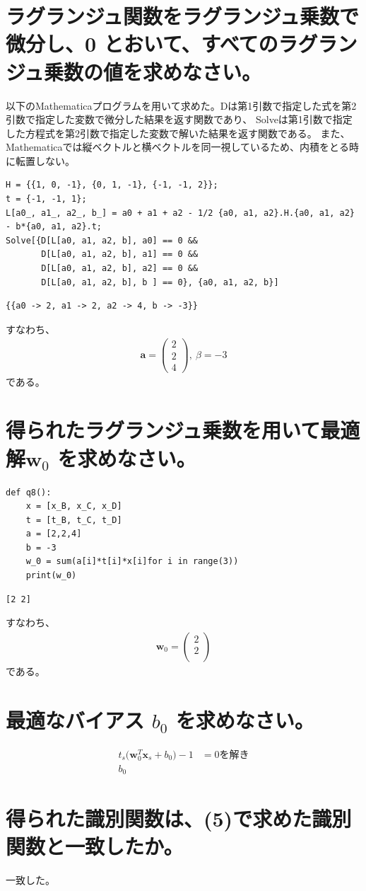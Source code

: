 \documentclass{ltjsarticle}
\begin{document}
\section{ラグランジュ関数をラグランジュ乗数で微分し、0 とおいて、すべてのラグランジュ乗数の値を求めなさい。}
以下のMathematicaプログラムを用いて求めた。Dは第1引数で指定した式を第2引数で指定した変数で微分した結果を返す関数であり、
Solveは第1引数で指定した方程式を第2引数で指定した変数で解いた結果を返す関数である。
また、Mathematicaでは縦ベクトルと横ベクトルを同一視しているため、内積をとる時に転置しない。
\begin{lstlisting}[caption=input]
H = {{1, 0, -1}, {0, 1, -1}, {-1, -1, 2}};
t = {-1, -1, 1};
L[a0_, a1_, a2_, b_] = a0 + a1 + a2 - 1/2 {a0, a1, a2}.H.{a0, a1, a2} - b*{a0, a1, a2}.t;
Solve[{D[L[a0, a1, a2, b], a0] == 0 &&
       D[L[a0, a1, a2, b], a1] == 0 &&
       D[L[a0, a1, a2, b], a2] == 0 &&
       D[L[a0, a1, a2, b], b ] == 0}, {a0, a1, a2, b}]
\end{lstlisting}
\begin{lstlisting}[caption=output]
{{a0 -> 2, a1 -> 2, a2 -> 4, b -> -3}}
\end{lstlisting}
すなわち、
\begin{align}
	\bm{a} =
	\begin{pmatrix}
		2\\
		2\\
		4
	\end{pmatrix}
	,\ 
	\beta = -3
\end{align}
である。

\section{得られたラグランジュ乗数を用いて最適解$ \bm{w}_0$ を求めなさい。}
\begin{lstlisting}[caption=w\_0を求めるPythonプログラム]
def q8():
    x = [x_B, x_C, x_D]
    t = [t_B, t_C, t_D]
    a = [2,2,4]
    b = -3
    w_0 = sum(a[i]*t[i]*x[i]for i in range(3))
    print(w_0)
\end{lstlisting}
\begin{lstlisting}[caption=output]
[2 2]
\end{lstlisting}
すなわち、
\begin{align}
	\bm{w}_0 =
	\begin{pmatrix}
		2\\
		2\\
	\end{pmatrix}
\end{align}
である。

\section{最適なバイアス $b_0$ を求めなさい。}
\begin{align}
	t_s\bigl(\bm{w}_0^T\bm{x}_s+b_0\bigr)-1&=0を解き\\
	b_0 %
\end{align}

\section{得られた識別関数は、(5)で求めた識別関数と一致したか。}
一致した。
\end{document}
